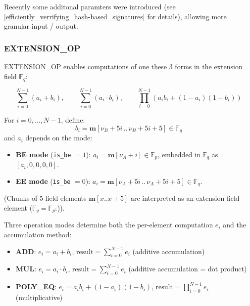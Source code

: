 \documentclass{article}
\theoremstyle{definition}
\newcommand{\Fp}{\mathbb F_p}
\newcommand{\Fq}{\mathbb F_q}
\begin{document}
Recently some additonal paramters were introduced (see \ref{efficiently_verrifying_hash-based_signatures} for details), allowing more granular input / output.

\subsubsection{EXTENSION\_OP}\label{extension_op_instruction}

EXTENSION\_OP enables computations of one these 3 forms in the extension field $\Fq$:

\[
\sum_{i=0}^{N-1} (a_i + b_i), \qquad
\sum_{i=0}^{N-1} (a_i \cdot b_i), \qquad
\prod_{i=0}^{N-1} (a_i b_i + (1 - a_i)(1 - b_i))
\]

\vspace{2mm}


\vspace{2mm}

For $i = 0, \ldots, N-1$, define:
$$b_i = \textbf{m}[\nu_B + 5i \,..\, \nu_B + 5i + 5] \in \Fq$$
and $a_i$ depends on the mode:
\begin{itemize}
    \item \textbf{BE mode} (\texttt{is\_be} $= 1$): $a_i = \textbf{m}[\nu_A + i] \in \Fp$, embedded in $\Fq$ as $[a_i, 0, 0, 0, 0]$.
    \item \textbf{EE mode} (\texttt{is\_be} $= 0$): $a_i = \textbf{m}[\nu_A + 5i \,..\, \nu_A + 5i + 5] \in \Fq$.
\end{itemize}

(Chunks of 5 field elements $\textbf{m}[x..x+5]$ are interpreted as an extension field element ($\Fq = {\mathbb F_{p^5}}$)).

\vspace{2mm}

Three operation modes determine both the per-element computation $e_i$ and the accumulation method:
\begin{itemize}
    \item \textbf{ADD}: $e_i = a_i + b_i$, \quad $\text{result} = \displaystyle\sum_{i=0}^{N-1} e_i$ \hfill (additive accumulation)
    \item \textbf{MUL}: $e_i = a_i \cdot b_i$, \quad $\text{result} = \displaystyle\sum_{i=0}^{N-1} e_i$ \hfill (additive accumulation = dot product)
    \item \textbf{POLY\_EQ}: $e_i = a_i b_i + (1 - a_i)(1 - b_i)$, \quad $\text{result} = \displaystyle\prod_{i=0}^{N-1} e_i$ \hfill (multiplicative)
\end{itemize}
\end{document}
